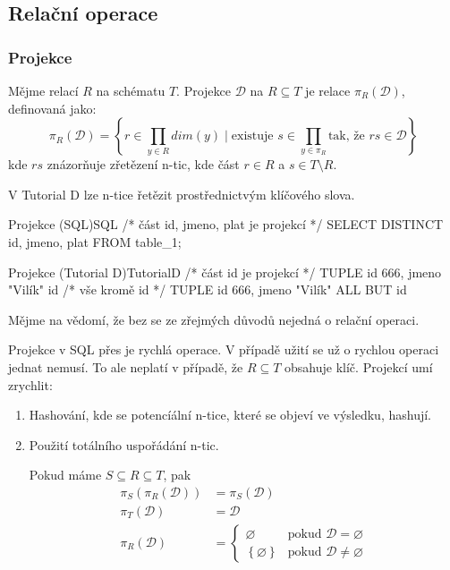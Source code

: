 \subsection{Relační operace}
\subsubsection{Projekce}
Mějme relací $R$ na schématu $T$. Projekce $\mathcal{D}$ na $R \subseteq T$ je relace $\pi_{R}(\mathcal{D})$, definovaná jako:
$$
\pi_{R}(\mathcal{D}) = \left\{ r \in \prod_{y \in R} dim(y) \; | \; \text{existuje } s \in \prod_{y \in \pi_{R}} \text{tak, že } rs \in \mathcal{D} \right\}
$$
kde $rs$ znázorňuje zřetězení n-tic, kde část $r \in R$ a $s \in T \setminus R$.

V Tutorial D lze n-tice řetězit prostřednictvým klíčového slova.
\begin{upcode}{Projekce (SQL)}{}{SQL}
/* část id, jmeno, plat je projekcí */
SELECT DISTINCT id, jmeno, plat FROM table_1;
\end{upcode}
\begin{upcode}{Projekce (Tutorial D)}{}{TutorialD}
/* část {id} je projekcí */
TUPLE {id 666, jmeno "Vilík"} {id}
/* vše kromě id */
TUPLE {id 666, jmeno "Vilík"} {ALL BUT id}
\end{upcode}
Mějme na vědomí, že bez se ze zřejmých důvodů nejedná o relační operaci.

Projekce v SQL přes je rychlá operace. V případě užití se už o rychlou operaci jednat nemusí. To ale neplatí v případě, že $R \subseteq T$ obsahuje klíč. Projekcí umí zrychlit:
\begin{enumerate}
\item Hashování, kde se potencíální n-tice, které se objeví ve výsledku, hashují.
\item Použití totálního uspořádání n-tic.
\begin{upquote}
Pokud máme $S \subseteq R \subseteq T$, pak
\begin{align*}
\pi_{S} (\pi_{R}(\mathcal{D})) &= \pi_{S}(\mathcal{D}) \\
\pi_{T} (\mathcal{D}) &= \mathcal{D} \\
\pi_{R} (\mathcal{D}) &=\left\{\!\!\!
\begin{array}{ll}
\varnothing & \text{pokud } \mathcal{D} = \varnothing \\
\left\{ \varnothing \right\} & \text{pokud } \mathcal{D} \neq \varnothing
\end{array}\right.
\end{align*}
\end{upquote}
\end{enumerate}

